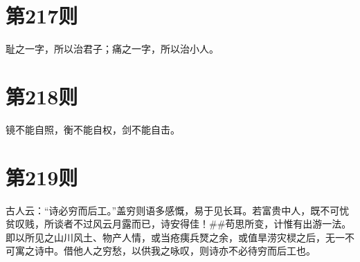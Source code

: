 \documentclass[12pt,a4paper]{ctexbook}
\begin{document}
\section{第217则}
耻之一字，所以治君子；痛之一字，所以治小人。\par

\section{第218则}
镜不能自照，衡不能自权，剑不能自击。\par

\section{第219则}
古人云：“诗必穷而后工。”盖穷则语多感慨，易于见长耳。若富贵中人，既不可忧贫叹贱，所谈者不过风云月露而已，诗安得佳！\#\#苟思所变，计惟有出游一法。即以所见之山川风土、物产人情，或当疮痍兵燹之余，或值旱涝灾棂之后，无一不可寓之诗中。借他人之穷愁，以供我之咏叹，则诗亦不必待穷而后工也。\par
\end{document}

